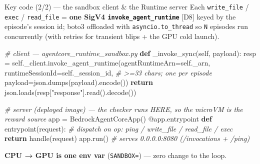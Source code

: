 \documentclass[
  10pt,
  ignorenonframetext,
  aspectratio=169,
  t]{beamer}
\newenvironment{Shaded}{}{}
\newcommand{\AttributeTok}[1]{\textcolor[rgb]{0.49,0.56,0.16}{#1}}
\newcommand{\CommentTok}[1]{\textcolor[rgb]{0.38,0.63,0.69}{\textit{#1}}}
\newcommand{\ControlFlowTok}[1]{\textcolor[rgb]{0.00,0.44,0.13}{\textbf{#1}}}
\newcommand{\KeywordTok}[1]{\textcolor[rgb]{0.00,0.44,0.13}{\textbf{#1}}}
\newcommand{\NormalTok}[1]{#1}
\newcommand{\OperatorTok}[1]{\textcolor[rgb]{0.40,0.40,0.40}{#1}}
\newcommand{\StringTok}[1]{\textcolor[rgb]{0.25,0.44,0.63}{#1}}
\newcommand{\VariableTok}[1]{\textcolor[rgb]{0.10,0.09,0.49}{#1}}
\begin{document}
\begin{frame}{Key code (2/2) --- the sandbox client \& the
Runtime server}
\protect\hypertarget{key-code-22-the-sandbox-client-the-runtime-server}{}
Each \texttt{write\_file} / \texttt{exec} / \texttt{read\_file} =
\textbf{one SigV4 \texttt{invoke\_agent\_runtime}} {[}D8{]} keyed by the
episode's session id; boto3 offloaded with \texttt{asyncio.to\_thread}
so \texttt{N} episodes run concurrently (with retries for transient
blips + the GPU cold launch).

\begin{Shaded}
\begin{Highlighting}[]
\CommentTok{\# client — agentcore\_runtime\_sandbox.py}
\KeywordTok{def}\NormalTok{ \_invoke\_sync(}\VariableTok{self}\NormalTok{, payload):}
\NormalTok{    resp }\OperatorTok{=} \VariableTok{self}\NormalTok{.\_client.invoke\_agent\_runtime(agentRuntimeArn}\OperatorTok{=}\VariableTok{self}\NormalTok{.\_arn,}
\NormalTok{        runtimeSessionId}\OperatorTok{=}\VariableTok{self}\NormalTok{.\_session\_id,        }\CommentTok{\# \textgreater{}=33 chars; one per episode}
\NormalTok{        payload}\OperatorTok{=}\NormalTok{json.dumps(payload).encode())}
    \ControlFlowTok{return}\NormalTok{ json.loads(resp[}\StringTok{"response"}\NormalTok{].read().decode())}
\end{Highlighting}
\end{Shaded}

\begin{Shaded}
\begin{Highlighting}[]
\CommentTok{\# server (deployed image) — the checker runs HERE, so the microVM is the reward source}
\NormalTok{app }\OperatorTok{=}\NormalTok{ BedrockAgentCoreApp()}
\AttributeTok{@app.entrypoint}
\KeywordTok{def}\NormalTok{ entrypoint(request):        }\CommentTok{\# dispatch on op: ping / write\_file / read\_file / exec}
    \ControlFlowTok{return}\NormalTok{ handle(request)}
\NormalTok{app.run()                       }\CommentTok{\# serves 0.0.0.0:8080  (/invocations + /ping)}
\end{Highlighting}
\end{Shaded}

\textbf{CPU → GPU is one env var} (\texttt{SANDBOX=}) --- zero change to
the loop.
\end{frame}
\end{document}
